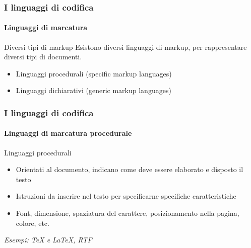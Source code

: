 \documentclass{beamer}
\begin{document}
\begin{frame}
	\frametitle{I linguaggi di codifica}
	\framesubtitle{Linguaggi di marcatura}
	\addtocounter{nframe}{1}

	\begin{block}{Diversi tipi di markup}
		Esistono diversi linguaggi di markup, per rappresentare diversi tipi di documenti.
		\begin{itemize}
			\item Linguaggi procedurali (specific markup languages)
			\item Linguaggi dichiarativi (generic markup languages)
		\end{itemize}
	\end{block}
\end{frame}

\begin{frame}
	\frametitle{I linguaggi di codifica}
	\framesubtitle{Linguaggi di marcatura procedurale}
	\addtocounter{nframe}{1}

	\begin{block}{Linguaggi procedurali}
		\begin{itemize}
			\item Orientati al documento, indicano come deve essere elaborato e
			      disposto il testo
			\item Istruzioni da inserire nel testo per specificarne specifiche
			      caratteristiche
			\item Font, dimensione, spaziatura del carattere, posizionamento
			      nella pagina, colore, etc.
		\end{itemize}
	\end{block}

	\textit{Esempi: TeX e LaTeX, RTF}

\end{frame}

\begin{frame}[fragile]
	\frametitle{I linguaggi di codifica}
	\framesubtitle{Linguaggi di marcatura procedurale}
	\addtocounter{nframe}{1}

	\defverbatim{\rtf}{%
		\begin{tiny}
			\begin{verbatim}

{\rtf1\ansi\deff0\adeflang1025
{\fonttbl{\f0\froman\fprq2\fcharset0 Times New Roman;}
{\f1\froman\fprq2\fcharset0 Times New Roman;}
{\f2\fnil\fprq2\fcharset0 Lucida Sans Unicode;}
{\colortbl;\red0\green0\blue0;\red128\green128\blue128;}
{\stylesheet{\s1\cf0{\*\hyphen2\hyphlead2\hyphtrail2\hyphmax0}
\rtlch\af5\afs24\lang255\ltrch\dbch\af2\afs24\langfe255\loch\f0\fs24\lang1040\snext1 Standard;}

        \end{verbatim}
		\end{tiny}
	}

	\begin{block}{Esempio RTF}
		{\rtf}
	\end{block}

\end{frame}
\end{document}
